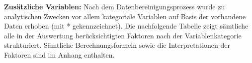\newline\newline
\textbf{Zusätzliche Variablen:} Nach dem Datenbereinigungsprozess wurde zu analytischen Zwecken vor allem kategoriale Variablen auf Basis der vorhandene Daten erhoben (mit * gekennzeichnet). Die nachfolgende Tabelle zeigt sämtliche alle in der Auswertung berücksichtigten Faktoren nach der Variablenkategorie strukturiert. Sämtliche Berechnungsformeln sowie die Interpretationen der Faktoren sind im Anhang enthalten.



